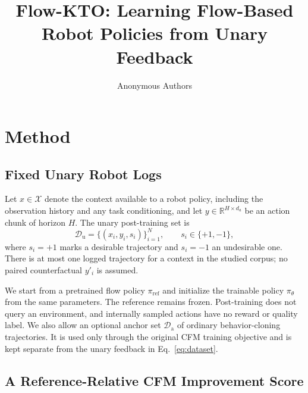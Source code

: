 \documentclass[10pt]{article}
\title{Flow-KTO: Learning Flow-Based Robot Policies from Unary Feedback}
\author{Anonymous Authors}
\date{}
\newcommand{\Dunary}{\mathcal{D}_{\mathrm{u}}}
\newcommand{\Danchor}{\mathcal{D}_{\mathrm{a}}}
\begin{document}
\maketitle

\begin{abstract}
\end{abstract}



\section{Method}

\subsection{Fixed Unary Robot Logs}

Let $x\in\mathcal{X}$ denote the context available to a robot policy, including
the observation history and any task conditioning, and let
$y\in\mathbb{R}^{H\times d_a}$ be an action chunk of horizon $H$. The unary
post-training set is
\begin{equation}
    \Dunary=\{(x_i,y_i,s_i)\}_{i=1}^{N},
    \qquad s_i\in\{+1,-1\},
    \label{eq:dataset}
\end{equation}
where $s_i=+1$ marks a desirable trajectory and $s_i=-1$ an undesirable one.
There is at most one logged trajectory for a context in the studied corpus; no
paired counterfactual $y'_i$ is assumed.

We start from a pretrained flow policy $\pi_{\mathrm{ref}}$ and initialize the
trainable policy $\pi_\theta$ from the same parameters. The reference remains
frozen. Post-training does not query an environment, and internally sampled
actions have no reward or quality label. We also allow an optional anchor set
$\Danchor$ of ordinary behavior-cloning trajectories. It is used only through
the original CFM training objective and is kept separate from the unary
feedback in Eq.~\eqref{eq:dataset}.

\subsection{A Reference-Relative CFM Improvement Score}
\end{document}
